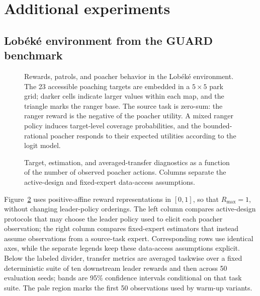 \section{Additional experiments}

\subsection{Lob\'ek\'e environment from the GUARD benchmark}



\begin{figure}[H]
  \centering
  \resizebox{0.94\textwidth}{!}{%
  }
  \caption{Rewards, patrols, and poacher behavior in the Lob\'ek\'e environment.
  The 23 accessible poaching targets are embedded in a $5\times5$ park grid;
  darker cells indicate larger values within each map, and the triangle marks
  the ranger base. The source task is zero-sum: the ranger reward is the
  negative of the poacher utility. A mixed ranger policy induces target-level
  coverage probabilities, and the bounded-rational poacher responds to their
  expected utilities according to the logit model.}
  \label{fig:appendix-lobeke-environment}
\end{figure}

\begin{figure}[p]
  \centering
  \resizebox{\textwidth}{!}{%
  }
  \caption{Target, estimation, and averaged-transfer diagnostics as a function
  of the number of observed poacher actions. Columns separate the active-design
  and fixed-expert data-access assumptions.}
  \label{fig:appendix-lobeke-diagnostics}
\end{figure}
\clearpage

Figure~\ref{fig:appendix-lobeke-diagnostics} uses positive-affine reward
representations in $[0,1]$, so that $R_{\max}=1$, without changing leader-policy
orderings. The left column compares active-design protocols that may choose the
leader policy used to elicit each poacher observation; the right column compares
fixed-expert estimators that instead assume observations from a source-task
expert. Corresponding rows use identical axes, while the separate legends keep
these data-access assumptions explicit. Below the labeled divider, transfer
metrics are averaged taskwise over a fixed deterministic suite of ten downstream
leader rewards and then across 50 evaluation seeds; bands are 95\% confidence
intervals conditional on that task suite. The pale region marks the first 50
observations used by warm-up variants.


